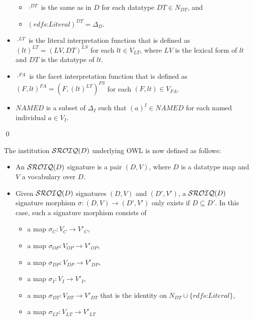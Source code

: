 \documentclass[10pt,fleqn,final]{scrreprt}
\newenvironment{definitions}[0]{\medskip }{}
\begin{document}
\begin{definitions}
\begin{definition}
\begin{itemize}
\begin{itemize}
\item
        $\cdot^{DT}$ is the same as in $D$ for each datatype $DT \in N_{DT}$, and
\item
        $(\textit{rdfs:Literal})^{DT} = \Delta_D$. 
\end{itemize}
\item
    $\cdot^{LT}$ is the literal interpretation function that is defined as $(lt)^{LT} = ( LV , DT )^{LS}$ for each $lt \in V_{LT}$, where $LV$ is the lexical form of $lt$ and $DT$ is the datatype of $lt$.
\item
    $\cdot^{FA}$ is the facet interpretation function that is defined as $( F , lt )^{FA} = ( F , (lt)^{LT} )^{FS}$ for each $( F , lt ) \in V_{FA}$.
\item
    $\mathit{NAMED}$ is a subset of $\Delta_I$ such that $(a)^{I} \in \mathit{NAMED}$ for each named individual $a \in V_{I}$. 
\end{itemize}
\qed\end{definition}

The institution $\mathcal{SROIQ}(D)$ underlying OWL is now defined as follows:
\begin{definition}
\begin{itemize}
\item An $\mathcal{SROIQ}(D)$ signature is a pair $(D,V)$, where $D$ is a
  datatype map and $V$ a vocabulary over $D$.
\item Given $\mathcal{SROIQ}(D)$ signatures $(D,V)$ and $(D',V')$, a
  $\mathcal{SROIQ}(D)$ signature morphism $\sigma\colon (D,V)\to(D',V')$ only
  exists if $D\subseteq D'$. In this case, such a signature morphism
  consists of
\begin{itemize}
\item a map $\sigma_C\colon V_{C}\to V'_{C}$,
\item a map $\sigma_{OP}\colon V_{OP}\to V'_{OP}$,
\item a map $\sigma_{DP}\colon V_{DP}\to V'_{DP}$,
\item a map $\sigma_I\colon V_{I}\to V'_{I}$,
\item a map $\sigma_{DT}\colon V_{DT}\to V'_{DT}$ that is the identity
on $N_{DT} \cup \{ \textit{rdfs:Literal} \}$,
\item a map $\sigma_{LT}\colon V_{LT}\to V'_{LT}$ 


\end{itemize}
\end{itemize}
\end{definition}
\end{definitions}
\end{document}
